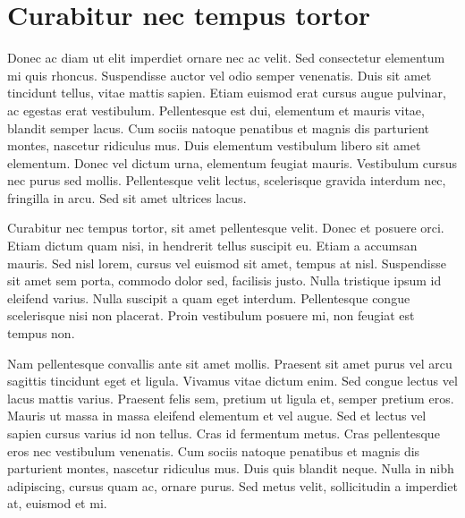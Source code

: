 ﻿\chapter{Curabitur nec tempus tortor}

Donec ac diam ut elit imperdiet ornare nec ac velit. Sed consectetur elementum mi quis rhoncus. Suspendisse auctor vel odio semper venenatis. Duis sit amet tincidunt tellus, vitae mattis sapien. Etiam euismod erat cursus augue pulvinar, ac egestas erat vestibulum. Pellentesque est dui, elementum et mauris vitae, blandit semper lacus. Cum sociis natoque penatibus et magnis dis parturient montes, nascetur ridiculus mus. Duis elementum vestibulum libero sit amet elementum. Donec vel dictum urna, elementum feugiat mauris. Vestibulum cursus nec purus sed mollis. Pellentesque velit lectus, scelerisque gravida interdum nec, fringilla in arcu. Sed sit amet ultrices lacus.

Curabitur nec tempus tortor, sit amet pellentesque velit. Donec et posuere orci. Etiam dictum quam nisi, in hendrerit tellus suscipit eu. Etiam a accumsan mauris. Sed nisl lorem, cursus vel euismod sit amet, tempus at nisl. Suspendisse sit amet sem porta, commodo dolor sed, facilisis justo. Nulla tristique ipsum id eleifend varius. Nulla suscipit a quam eget interdum. Pellentesque congue scelerisque nisi non placerat. Proin vestibulum posuere mi, non feugiat est tempus non.

Nam pellentesque convallis ante sit amet mollis. Praesent sit amet purus vel arcu sagittis tincidunt eget et ligula. Vivamus vitae dictum enim. Sed congue lectus vel lacus mattis varius. Praesent felis sem, pretium ut ligula et, semper pretium eros. Mauris ut massa in massa eleifend elementum et vel augue. Sed et lectus vel sapien cursus varius id non tellus. Cras id fermentum metus. Cras pellentesque eros nec vestibulum venenatis. Cum sociis natoque penatibus et magnis dis parturient montes, nascetur ridiculus mus. Duis quis blandit neque. Nulla in nibh adipiscing, cursus quam ac, ornare purus. Sed metus velit, sollicitudin a imperdiet at, euismod et mi. 